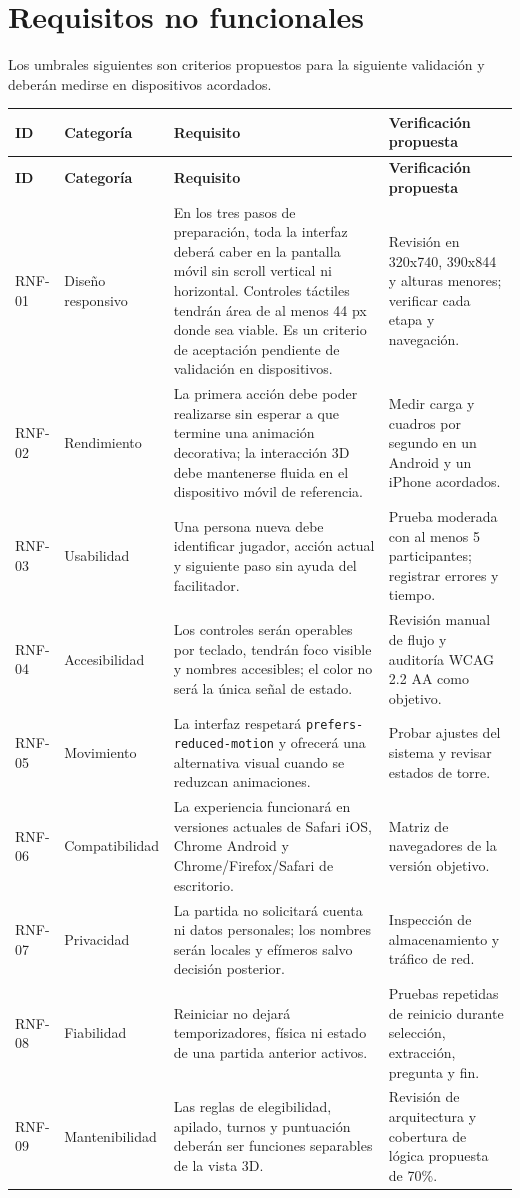 \documentclass[11pt,letterpaper]{article}
\begin{document}
\section{Requisitos no funcionales}

Los umbrales siguientes son criterios propuestos para la siguiente validación y deberán medirse en dispositivos acordados.

\begin{longtable}{@{}p{.06\linewidth}p{.16\linewidth}p{.43\linewidth}p{.18\linewidth}@{}}
\toprule
\textbf{ID} & \textbf{Categoría} & \textbf{Requisito} & \textbf{Verificación propuesta} \\
\midrule
\endfirsthead
\toprule
\textbf{ID} & \textbf{Categoría} & \textbf{Requisito} & \textbf{Verificación propuesta} \\
\midrule
\endhead
RNF-01 & Diseño responsivo & En los tres pasos de preparación, toda la interfaz deberá caber en la pantalla móvil sin scroll vertical ni horizontal. Controles táctiles tendrán área de al menos 44 px donde sea viable. Es un criterio de aceptación pendiente de validación en dispositivos. & Revisión en 320x740, 390x844 y alturas menores; verificar cada etapa y navegación. \\
RNF-02 & Rendimiento & La primera acción debe poder realizarse sin esperar a que termine una animación decorativa; la interacción 3D debe mantenerse fluida en el dispositivo móvil de referencia. & Medir carga y cuadros por segundo en un Android y un iPhone acordados. \\
RNF-03 & Usabilidad & Una persona nueva debe identificar jugador, acción actual y siguiente paso sin ayuda del facilitador. & Prueba moderada con al menos 5 participantes; registrar errores y tiempo. \\
RNF-04 & Accesibilidad & Los controles serán operables por teclado, tendrán foco visible y nombres accesibles; el color no será la única señal de estado. & Revisión manual de flujo y auditoría WCAG 2.2 AA como objetivo. \\
RNF-05 & Movimiento & La interfaz respetará \texttt{prefers-reduced-motion} y ofrecerá una alternativa visual cuando se reduzcan animaciones. & Probar ajustes del sistema y revisar estados de torre. \\
RNF-06 & Compatibilidad & La experiencia funcionará en versiones actuales de Safari iOS, Chrome Android y Chrome/Firefox/Safari de escritorio. & Matriz de navegadores de la versión objetivo. \\
RNF-07 & Privacidad & La partida no solicitará cuenta ni datos personales; los nombres serán locales y efímeros salvo decisión posterior. & Inspección de almacenamiento y tráfico de red. \\
RNF-08 & Fiabilidad & Reiniciar no dejará temporizadores, física ni estado de una partida anterior activos. & Pruebas repetidas de reinicio durante selección, extracción, pregunta y fin. \\
RNF-09 & Mantenibilidad & Las reglas de elegibilidad, apilado, turnos y puntuación deberán ser funciones separables de la vista 3D. & Revisión de arquitectura y cobertura de lógica propuesta de 70\%. \\
\bottomrule
\end{longtable}
\end{document}
